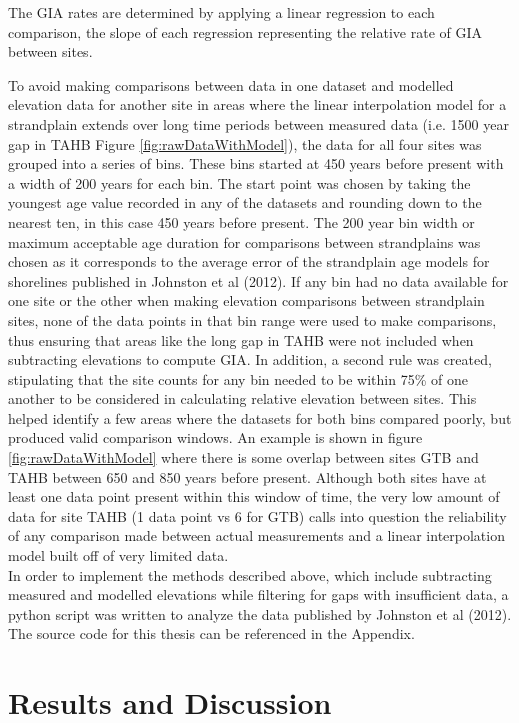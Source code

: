 \documentclass{article}
\begin{document}
 The GIA rates are determined by applying a linear regression to each comparison,
 the slope of each regression representing the relative rate of GIA between sites.
 
 To avoid making comparisons between data in one dataset and modelled elevation
 data for another site in areas where the linear interpolation model for a
 strandplain extends over long time periods between measured data
 (i.e. 1500 year gap in TAHB Figure \ref{fig:rawDataWithModel}), the data for all four sites was grouped into a series of bins.
 These bins started at 450 years before present with a width of 200 years for each bin.
 The start point was chosen by taking the youngest age value recorded in any of
 the datasets and rounding down to the nearest ten, in this case 450 years
 before present. The 200 year bin width or maximum acceptable age duration for
 comparisons between strandplains was chosen as it corresponds to the average error
 of the strandplain age models for shorelines published in Johnston et al (2012).
 If any bin had no data
 available for one site or the other when making elevation comparisons between
 strandplain sites, none of the data points in
 that bin range were used to make comparisons, thus ensuring that areas like the
 long gap in TAHB were not included when subtracting elevations to compute GIA.
 In addition, a second rule
 was created, stipulating that the site counts for any bin needed to be within
 75\% of one another to be considered
 in calculating relative elevation between sites. This
 helped identify a few areas where the datasets for both bins compared poorly,
 but produced valid comparison windows. An example is shown in figure \ref{fig:rawDataWithModel}
 where there is some overlap between sites GTB and TAHB between 650 and 850 years
 before present. Although both sites have at least one data point present within this
 window of time, the very low amount of data for site TAHB (1 data point vs 6 for
 GTB) calls into question the reliability of any comparison made between actual measurements
 and a linear interpolation model built off of very limited data.\\
 In order to implement the methods described above, which include subtracting
 measured and modelled elevations while filtering for gaps with insufficient
 data, a python script was written to analyze the data published by Johnston et
 al (2012). The source code for this thesis can be referenced in the Appendix.

\newpage

\section{Results and Discussion}

\end{document}
